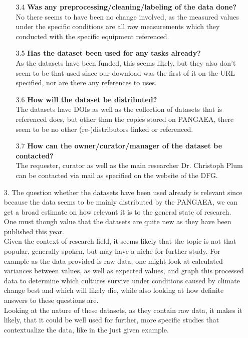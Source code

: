 \begin{itemize}
\begin{itemize}
                \item[3.4] \textbf{Was any preprocessing/cleaning/labeling of the data done?} \\
                    No there seems to have been no change involved, as the measured values under the specific conditions are all raw measurements which they conducted with the specific equipment referenced.
                \item[3.5] \textbf{Has the dataset been used for any tasks already?} \\
                    As the datasets have been funded, this seems likely, but they also don't seem to be that used since our download was the first of it on the URL specified, nor are there any references to uses.
                \item[3.6] \textbf{How will the dataset be distributed?} \\
                    The datasets have DOIs as well as the collection of datasets that is referenced does, but other than the copies stored on PANGAEA, there seem to be no other (re-)distributors linked or referenced.
                \item[3.7] \textbf{How can the owner/curator/manager of the dataset be contacted?} \\
                    The requester, curator as well as the main researcher Dr. Christoph Plum can be contacted via mail as specified on the website of the DFG.
            \end{itemize}
        \item[3.] The question whether the datasets have been used already is relevant since because the data seems to be mainly distributed by the PANGAEA, we can get a broad estimate on how relevant it is to the general state of research. One must though value that the datasets are quite new as they have been published this year. \\
        Given the context of research field, it seems likely that the topic is not that popular, generally spoken, but may have a niche for further study. For example as the data provided is raw data, one might look at calculated variances between values, as well as expected values, and graph this processed data to determine which cultures survive under conditions caused by climate change best and which will likely die, while also looking at how definite answers to these questions are. \\
        Looking at the nature of these datasets, as they contain raw data, it makes it likely, that it could be well used for further, more specific studies that contextualize the data, like in the just given example.
    \end{itemize}

